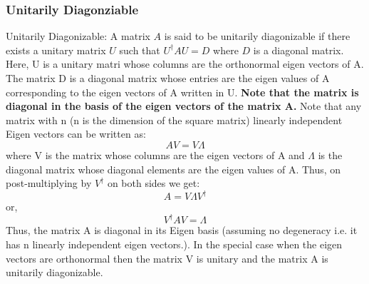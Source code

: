 \subsubsection{Unitarily Diagonziable}
\begin{definition}
Unitarily Diagonizable: A matrix $A$ is said to be unitarily diagonizable if there exists a unitary matrix $U$ such that $U^{\dagger}AU=D$ where $D$ is a diagonal matrix.
Here, U is a unitary matri whose columns are the orthonormal eigen vectors of A. The matrix D is a diagonal matrix whose entries are the eigen values of A corresponding to the 
eigen vectors of A written in U.
\textbf{Note that the matrix is diagonal in the basis of the eigen vectors of the matrix A.}
Note that any matrix with n (n is the dimension of the square matrix) linearly independent Eigen vectors can be written as:
\[ AV=V\Lambda\]
where V is the matrix whose columns are the eigen vectors of A and $\Lambda$ is the diagonal matrix whose diagonal elements are the eigen values of A.
Thus, on post-multiplying by $V^{\dagger}$ on both sides we get:
\[ A= V\Lambda V^{\dagger} \]
or,
\[ V^{\dagger}AV=\Lambda \]
Thus, the matrix A is diagonal in its Eigen basis (assuming no degeneracy i.e. it has n linearly independent eigen vectors.). 
In the special case when the eigen vectors are orthonormal then the matrix V is unitary and the matrix A is unitarily diagonizable.
\end{definition}
